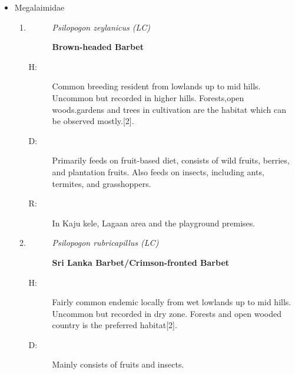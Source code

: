 \begin{itemize}
\begin{enumerate}
\begin{description}%
\item[H: ]%
Common breeding resident from lowlands up to mid hills. uncommon and local further in higher hills. Mostly being on the ground can be seen in wooded areas and trees in villages and town gardens. Avoids forests in wet zone and adjoining hills.{[}2{]}.%
\item[D: ]%
Diet includes insects, spiders, small fruits, grains, nectar, and occasionally, lizards or scavenged scraps of food from human habitations.%
\item[R: ]%
Throughout the university.%
\end{description}%
\end{enumerate}%
\item%
Megalaimidae%
\begin{enumerate}%
\item%
\begin{description}%
\item[]%
\textit{Psilopogon zeylanicus (LC)}%
\item[]%
\textbf{Brown{-}headed Barbet}%
\end{description}%
\begin{description}%
\item[H: ]%
Common breeding resident from lowlands up to mid hills. Uncommon but recorded in higher hills. Forests,open woods.gardens and trees in cultivation are the habitat which can be observed mostly.{[}2{]}.%
\item[D: ]%
Primarily feeds on fruit{-}based diet, consists of wild fruits, berries, and plantation fruits. Also feeds on insects, including ants, termites, and grasshoppers.%
\item[R: ]%
In Kaju kele, Lagaan area and the playground premises.%
\end{description}%
\item%
\begin{description}%
\item[]%
\textit{Psilopogon rubricapillus (LC)}%
\item[]%
\textbf{Sri Lanka Barbet/Crimson{-}fronted Barbet}%
\end{description}%
\begin{description}%
\item[H: ]%
Fairly common endemic locally from wet lowlands up to mid hills. Uncommon but recorded in dry zone. Forests and open wooded country is the preferred habitat{[}2{]}.%
\item[D: ]%
Mainly consists of fruits and insects.%

\end{description}
\end{enumerate}
\end{itemize}
